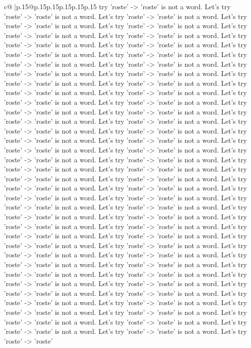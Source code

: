 \documentclass{article}
\begin{document}
{\begin{supertabular}{c@{$\;$}|p{.15\linewidth}@{}p{.15\linewidth}p{.15\linewidth}p{.15\linewidth}p{.15\linewidth}p{.15\linewidth}}
{{{try 'roste' {-}> 'roste' is not a word. Let's try 'roste' {-}> 'roste' is not a word. Let's try 'roste' {-}> 'roste' is not a word. Let's try 'roste' {-}> 'roste' is not a word. Let's try 'roste' {-}> 'roste' is not a word. Let's try 'roste' {-}> 'roste' is not a word. Let's try 'roste' {-}> 'roste' is not a word. Let's try 'roste' {-}> 'roste' is not a word. Let's try 'roste' {-}> 'roste' is not a word. Let's try 'roste' {-}> 'roste' is not a word. Let's try 'roste' {-}> 'roste' is not a word. Let's try 'roste' {-}> 'roste' is not a word. Let's try 'roste' {-}> 'roste' is not a word. Let's try 'roste' {-}> 'roste' is not a word. Let's try 'roste' {-}> 'roste' is not a word. Let's try 'roste' {-}> 'roste' is not a word. Let's try 'roste' {-}> 'roste' is not a word. Let's try 'roste' {-}> 'roste' is not a word. Let's try 'roste' {-}> 'roste' is not a word. Let's try 'roste' {-}> 'roste' is not a word. Let's try 'roste' {-}> 'roste' is not a word. Let's try 'roste' {-}> 'roste' is not a word. Let's try 'roste' {-}> 'roste' is not a word. Let's try 'roste' {-}> 'roste' is not a word. Let's try 'roste' {-}> 'roste' is not a word. Let's try 'roste' {-}> 'roste' is not a word. Let's try 'roste' {-}> 'roste' is not a word. Let's try 'roste' {-}> 'roste' is not a word. Let's try 'roste' {-}> 'roste' is not a word. Let's try 'roste' {-}> 'roste' is not a word. Let's try 'roste' {-}> 'roste' is not a word. Let's try 'roste' {-}> 'roste' is not a word. Let's try 'roste' {-}> 'roste' is not a word. Let's try 'roste' {-}> 'roste' is not a word. Let's try 'roste' {-}> 'roste' is not a word. Let's try 'roste' {-}> 'roste' is not a word. Let's try 'roste' {-}> 'roste' is not a word. Let's try 'roste' {-}> 'roste' is not a word. Let's try 'roste' {-}> 'roste' is not a word. Let's try 'roste' {-}> 'roste' is not a word. Let's try 'roste' {-}> 'roste' is not a word. Let's try 'roste' {-}> 'roste' is not a word. Let's try 'roste' {-}> 'roste' is not a word. Let's try 'roste' {-}> 'roste' is not a word. Let's try 'roste' {-}> 'roste' is not a word. Let's try 'roste' {-}> 'roste' is not a word. Let's try 'roste' {-}> 'roste' is not a word. Let's try 'roste' {-}> 'roste' is not a word. Let's try 'roste' {-}> 'roste' is not a word. Let's try 'roste' {-}> 'roste' is not a word. Let's try 'roste' {-}> 'roste' is not a word. Let's try 'roste' {-}> 'roste' is not a word. Let's try 'roste' {-}> 'roste' is not a word. Let's try 'roste' {-}> 'roste' is not a word. Let's try 'roste' {-}> 'roste' is not a word. Let's try 'roste' {-}> 'roste' is not a word. Let's try 'roste' {-}> 'roste' is not a word. Let's try 'roste' {-}> 'roste' is not a word. Let's try 'roste' {-}> 'roste' is not a word. Let's try 'roste' {-}> 'roste' is not a word. Let's try 'roste' {-}> 'roste' is not a word. Let's try 'roste' {-}> 'roste' is not a word. Let's try 'roste' {-}> 'roste' is not a word. Let's try 'roste' {-}> 'roste' is not a word. Let's try 'roste' {-}> 'roste' is not a word. Let's try 'roste' {-}> 'roste' is not a word. Let's try 'roste' {-}> 'roste' is not a word. Let's try 'roste' {-}> 'roste' is not a word. Let's try 'roste' {-}> 'roste' is not a word. Let's try 'roste' {-}> 'roste' }}}
\end{supertabular}}
\end{document}
